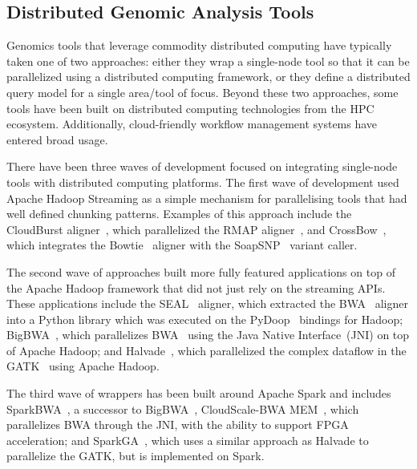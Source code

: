 \documentclass[phd]{ucbthesis}
\begin{document}
\subsection{Distributed Genomic Analysis Tools}
\label{sec:distributed-genome-analysis}

Genomics tools that leverage commodity distributed computing have typically
taken one of two approaches: either they wrap a single-node tool so that it can
be parallelized using a distributed computing framework, or they define a
distributed query model for a single area/tool of focus. Beyond these two
approaches, some tools have been built on distributed computing technologies
from the HPC ecosystem. Additionally, cloud-friendly workflow management
systems have entered broad usage.

There have been three waves of development focused on integrating single-node
tools with distributed computing platforms. The first wave of development used
{Apache Hadoop Streaming} as a simple mechanism for parallelising tools
that had well defined chunking patterns. Examples of this approach include the
{CloudBurst} aligner~\cite{schatz09}, which parallelized the
{RMAP} aligner~\cite{smith08}, and
{CrossBow}~\cite{langmead09crossbow}, which integrates the
{Bowtie}~\cite{langmead09bowtie} aligner with the
{SoapSNP}~\cite{li09snp} variant caller.

The second wave of approaches
built more fully featured applications on top of the {Apache Hadoop}
framework that did not just rely on the streaming APIs. These applications
include the {SEAL}~\cite{pireddu11} aligner, which extracted the
{BWA}~\cite{li09} aligner into a Python library which was executed
on the {PyDoop}~\cite{leo10} bindings for {Hadoop};
{BigBWA}~\cite{abuin15}, which parallelizes {BWA}~\cite{li09}
using the Java Native Interface~(JNI) on top of {Apache Hadoop}; and
{Halvade}~\cite{decap15}, which parallelized the complex dataflow in
the {GATK}~\cite{depristo11} using {Apache Hadoop}.

The third
wave of wrappers has been built around {Apache Spark} and includes
{SparkBWA}~\cite{abuin16}, a successor to {BigBWA}~\cite{abuin15},
{CloudScale-BWA MEM}~\cite{chen16}, which parallelizes
{BWA} through the JNI, with the ability to support {FPGA}
acceleration; and {SparkGA}~\cite{mushtaq17}, which uses a similar
approach as {Halvade} to parallelize the {GATK}, but is
implemented on {Spark}.
\end{document}
